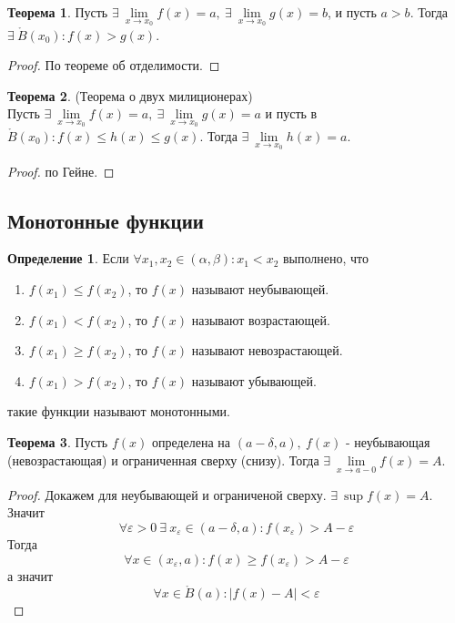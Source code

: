 \documentclass[a4paper, 12pt]{article}
\newcommand{\Bo}{\mathring{B}}
\renewcommand{\epsilon}{\varepsilon}
\theoremstyle{definition}
\newtheorem*{definition}{Определение}
\newtheorem*{theorem}{Теорема}
\begin{document}
        \begin{theorem}
            Пусть $\exists\ \lim\limits_{x\to x_0}f(x)=a,\ \exists\ \lim\limits_{x\to x_0}g(x)=b$, и пусть $a>b$. Тогда $\exists\ \Bo(x_0): f(x)>g(x)$.
        \end{theorem}
        \begin{proof}
            По теореме об отделимости.
        \end{proof} 
        \begin{theorem}(Теорема о двух милиционерах)\\
            Пусть $\exists\ \lim\limits_{x\to x_0}f(x)=a,\ \exists\ \lim\limits_{x\to x_0}g(x)=a$ и пусть в $\Bo(x_0): f(x)\leq h(x)\leq g(x)$. Тогда $\exists\ \lim\limits_{x\to x_0}h(x)=a$.
        \end{theorem} 
        \begin{proof}
            по Гейне.
        \end{proof} 
    \subsection{Монотонные функции}
        \begin{definition}
            Если $\forall x_1, x_2\in (\alpha, \beta): x_1<x_2$ выполнено, что
            \begin{enumerate}
                \item $f(x_1)\leq f(x_2)$, то $f(x)$ называют неубывающей.
                \item $f(x_1)< f(x_2)$, то $f(x)$ называют возрастающей.
                \item $f(x_1)\geq f(x_2)$, то $f(x)$ называют невозрастающей.
                \item $f(x_1)> f(x_2)$, то $f(x)$ называют убывающей.
            \end{enumerate}
            такие функции называют монотонными.
        \end{definition} 
        \begin{theorem}
            Пусть $f(x)$ определена на $(a-\delta, a),\ f(x)$ - неубывающая (невозрастающая) и ограниченная сверху (снизу). Тогда $\exists\ \lim\limits_{x\to a-0}f(x)=A$.
        \end{theorem} 
        \begin{proof}
            Докажем для неубывающей и ограниченой сверху. $\exists\ \sup{f(x)}=A$. Значит
            \[\forall \epsilon>0\ \exists\ x_{\epsilon}\in (a-\delta, a): f(x_{\epsilon})>A-\epsilon\] 
            Тогда 
            \[\forall x\in (x_{\epsilon},a): f(x)\geq f(x_{\epsilon})>A-\epsilon\] 
            а значит
            \[\forall x\in \Bo(a): |f(x)-A|<\epsilon\]
        \end{proof}
\end{document}
